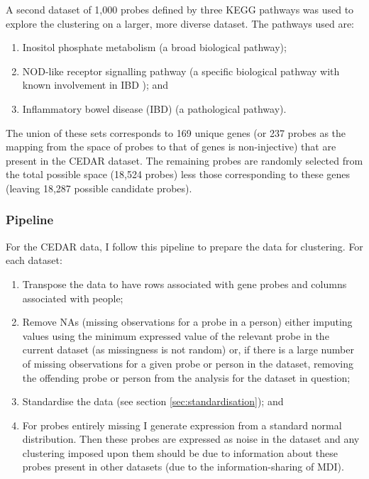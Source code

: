 \documentclass[12pt]{article} %
\begin{document}
	A second dataset of 1,000 probes defined by three KEGG pathways was used to explore the clustering on a larger, more diverse dataset. The pathways used are:
	
	\begin{enumerate} \label{list:kegg_pathways}
		\item Inositol phosphate metabolism (a broad biological pathway);
		\item NOD-like receptor signalling pathway (a specific biological pathway with known involvement in IBD \citep{CarneiroNodlikeproteinsinflammation2008, GarrettHomeostasisInflammationIntestine2010}); and
		\item Inflammatory bowel disease (IBD) (a pathological pathway).
	\end{enumerate}

	The union of these sets corresponds to 169 unique genes (or 237 probes as the mapping from the space of probes to that of genes is non-injective) that are present in the CEDAR dataset. The remaining probes are randomly selected from the total possible space (18,524 probes) less those corresponding to these genes (leaving 18,287 possible candidate probes).

 	\subsubsection{Pipeline}
	For the CEDAR data, I follow this pipeline to prepare the data for clustering. For each dataset:
	\begin{enumerate} \label{list:methods}
		\item Transpose the data to have rows associated with gene probes and columns associated with people;
		\item Remove NAs (missing observations for a probe in a person) either imputing values using the minimum expressed value of the relevant probe in the current dataset (as missingness is not random) or, if there is a large number of missing observations for a given probe or person in the dataset, removing the offending probe or person from the analysis for the dataset in question;
		\item Standardise the data (see section \ref{sec:standardisation}); and
		\item For probes entirely missing I generate expression from a standard normal distribution. Then these probes are expressed as noise in the dataset and any clustering imposed upon them should be due to information about these probes present in other datasets (due to the information-sharing of MDI). %
	\end{enumerate}
\end{document}
